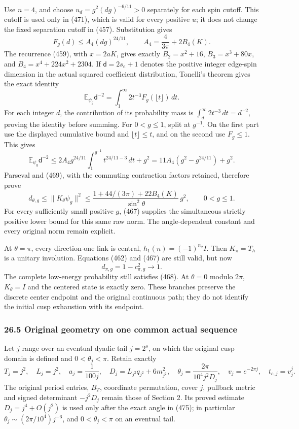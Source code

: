 \documentclass[
  11pt,
]{article}
\begin{document}
Use \(n=4\), and choose \(u_d=g^2(dg)^{-6/11}>0\) separately for each
spin cutoff. This cutoff is used only in (471), which is valid for every
positive \(u\); it does not change the fixed separation cutoff in (457).
Substitution gives \[
 F_g(d)\le A_4(dg)^{24/11},\qquad
 A_4=\frac4{3\pi}+2B_4(K).
\] The recurrence (459), with \(x=2aK\), gives exactly \(B_2=x^2+16\),
\(B_3=x^3+80x\), and \(B_4=x^4+224x^2+2304\). If \(\mathsf d=2s_e+1\)
denotes the positive integer edge-spin dimension in the actual squared
coefficient distribution, Tonelli's theorem gives the exact identity \[
 \mathbb E_{\psi_g}\mathsf d^{-2}
 =\int_1^\infty2t^{-3}F_g(\lfloor t\rfloor)\,dt .
 \tag{472}
\] For each integer \(d\), the contribution of its probability mass is
\(\int_d^\infty2t^{-3}\,dt=d^{-2}\), proving the identity before
summing. For \(0<g\le1\), split at \(g^{-1}\). On the first part use the
displayed cumulative bound and \(\lfloor t\rfloor\le t\), and on the
second use \(F_g\le1\). This gives \[
 \mathbb E_{\psi_g}\mathsf d^{-2}
 \le2A_4g^{24/11}\int_1^{g^{-1}}t^{24/11-3}\,dt+g^2
 =11A_4(g^2-g^{24/11})+g^2.
\] Parseval and (469), with the commuting contraction factors retained,
therefore prove \[
 d_{\theta,g}\le\|K_\theta\psi_g\|^2
 \le\frac{1+44/(3\pi)+22B_4(K)}{\sin^2\theta}\,g^2,
 \qquad 0<g\le1.
 \tag{473}
\] For every sufficiently small positive \(g\), (467) supplies the
simultaneous strictly positive lower bound for this same raw norm. The
angle-dependent constant and every original norm remain explicit.

At \(\theta=\pi\), every direction-one link is central,
\(h_1(n)=(-1)^{n_2}I\). Then \(K_\pi=T_h\) is a unitary involution.
Equations (462) and (467) are still valid, but now \[
 d_{\pi,g}=1-c_{\pi,g}^2\longrightarrow1 .
 \tag{474}
\] The complete low-energy probability still satisfies (468). At
\(\theta=0\) modulo \(2\pi\), \(K_\theta=I\) and the centered state is
exactly zero. These branches preserve the discrete center endpoint and
the original continuous path; they do not identify the initial cusp
exhaustion with its endpoint.

\subsubsection{26.5 Original geometry on one common actual
sequence}\label{original-geometry-on-one-common-actual-sequence}

Let \(j\) range over an eventual dyadic tail \(j=2^s\), on which the
original cusp domain is defined and \(0<\theta_j<\pi\). Retain exactly
\[
 T_j=j^2,\quad L_j=j^2,\quad a_j=\frac1{100j},\quad
 D_j=L_{j^2}q_{j^2}+6m_{j^2}^2,\quad
 \theta_j=\frac{2\pi}{10^4j^2D_j},
 \quad v_j=e^{-2\pi j},\quad t_{c,j}=v_j^j .
 \tag{475}
\] The original period entries, \(B_T\), coordinate permutation, cover
\(j\), pullback metric and signed determinant \(-j^2D_j\) remain those
of Section 2. Its proved estimate \(D_j=j^4+O(j^2)\) is used only after
the exact angle in (475); in particular
\(\theta_j\sim(2\pi/10^4)j^{-6}\), and \(0<\theta_j<\pi\) on an eventual
tail.
\end{document}
